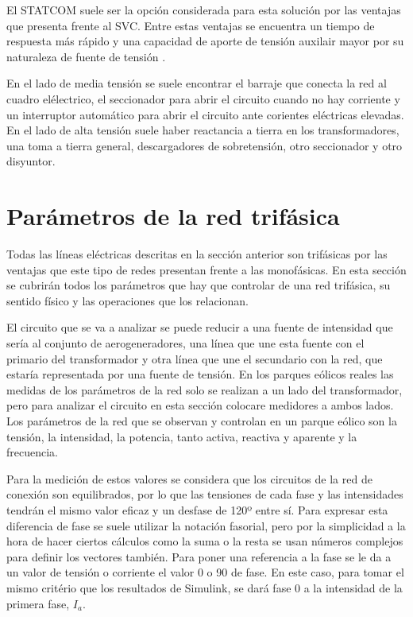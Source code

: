 \documentclass{book}
\begin{document}
El STATCOM suele ser la opci\'on considerada para esta soluci\'on por las ventajas que presenta frente al SVC. Entre estas ventajas se encuentra un tiempo de respuesta m\'as r\'apido y una capacidad de aporte de tensi\'on auxilair mayor por su naturaleza de fuente de tensi\'on \cite{STATCOM}. \par

En el lado de media tensi\'on se suele encontrar el barraje que conecta la red al cuadro el\'electrico, el seccionador para abrir el circuito cuando no hay corriente y un interruptor autom\'atico para abrir el circuito ante corientes el\'ectricas elevadas. En el lado de alta tensi\'on suele haber reactancia a tierra en los transformadores, una toma a tierra general, descargadores de sobretensi\'on, otro seccionador y otro disyuntor.  \par


	\section{Par\'ametros de la red trif\'asica} 
	
	Todas las l\'ineas el\'ectricas descritas en la secci\'on anterior son trif\'asicas por las ventajas que este tipo de redes presentan frente a las monof\'asicas. En esta secci\'on se cubrir\'an todos los par\'ametros que hay que controlar de una red trif\'asica, su sentido f\'isico y las operaciones que los relacionan. \par

El circuito que se va a analizar se puede reducir a una fuente de intensidad que ser\'ia al conjunto de aerogeneradores, una l\'inea que une esta fuente con el primario del transformador y otra l\'inea que une el secundario con la red, que estar\'ia representada por una fuente de tensi\'on. En los parques e\'olicos reales las medidas de los par\'ametros de la red solo se realizan a un lado del transformador, pero para analizar el circuito en esta secci\'on colocare medidores a ambos lados. Los par\'ametros de la red que se observan y controlan en un parque e\'olico son la tensi\'on, la intensidad, la potencia, tanto activa, reactiva y aparente y la frecuencia. \par

Para la medici\'on de estos valores se considera que los circuitos de la red de conexi\'on son equilibrados, por lo que las tensiones de cada fase y las intensidades tendr\'an el mismo valor eficaz y un desfase de 120º entre s\'i. Para expresar esta diferencia de fase se suele utilizar la notaci\'on fasorial,  pero por la simplicidad a la hora de hacer ciertos c\'alculos como la suma o la resta se usan n\'umeros complejos para definir los vectores tambi\'en. Para poner una referencia a la fase se le da a un valor de tensi\'on o corriente el valor 0 o 90 de fase. En este caso, para tomar el mismo crit\'erio que los resultados de Simulink, se dar\'a fase 0 a la intensidad de la primera fase, $I_a$. \par
\end{document}
